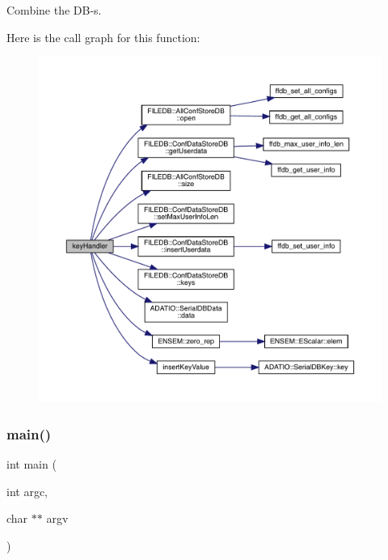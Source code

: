 Combine the D\+B-\/s. 

Here is the call graph for this function\+:
\nopagebreak
\begin{figure}[H]
\begin{center}
\leavevmode
\includegraphics[width=350pt]{d4/dbc/adat-devel_2main_2dbutil_2dbbin_8cc_accb30c2dbf14041f0de262e403fdace9_cgraph}
\end{center}
\end{figure}
\mbox{\label{adat-devel_2main_2dbutil_2dbbin_8cc_a3c04138a5bfe5d72780bb7e82a18e627}} 
\subsubsection{\texorpdfstring{main()}{main()}}
{\footnotesize\ttfamily int main (\begin{DoxyParamCaption}\item[{int}]{argc,  }\item[{char $\ast$$\ast$}]{argv }\end{DoxyParamCaption})}


